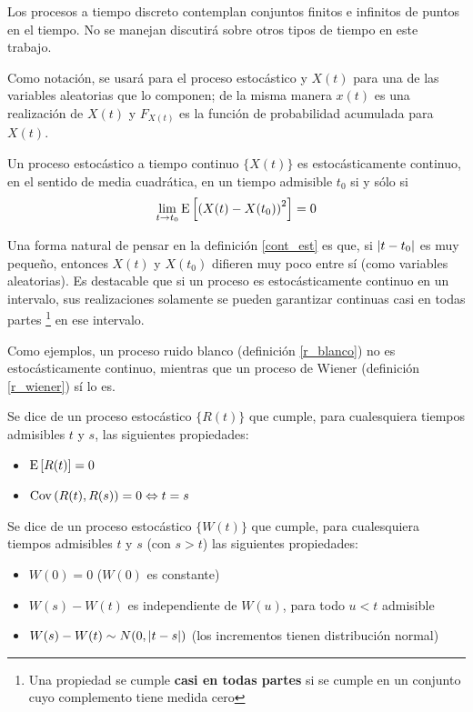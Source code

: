 Los procesos a tiempo discreto contemplan conjuntos finitos e infinitos de puntos en el tiempo.
No se manejan discutirá sobre otros tipos de tiempo en este trabajo.

Como notación, se usará \xt  para el proceso estocástico y $X(t)$ para una de las variables
aleatorias que lo componen; de la misma manera $x(t)$ es una realización de $X(t)$ y $F_{X(t)}$ 
es la función de probabilidad acumulada para $X(t)$.



\begin{definicion}
Un proceso estocástico a tiempo continuo $\{ X(t) \}$ es estocásticamente continuo, en el 
sentido de media cuadrática, en un tiempo admisible $t_0$ si y sólo si
\begin{equation*}
\lim_{t \rightarrow t_0} \mathrm{E}\left[ \left( X(t) - X(t_0) \right)^{2} \right] = 0
\end{equation*}
\label{cont_est}
\end{definicion}

Una forma natural de pensar en la definición \ref{cont_est} es que, si $\left| t-t_0 \right|$ es muy 
pequeño, entonces $X(t)$ y $X(t_0)$ difieren muy poco entre s\'i (como variables aleatorias).
Es destacable que si un proceso es estocásticamente continuo en un intervalo, sus realizaciones 
solamente se pueden garantizar continuas casi en todas partes \footnote{Una propiedad se cumple 
\textbf{casi en todas partes} si se cumple en un conjunto cuyo complemento tiene medida cero} en 
ese intervalo.

Como ejemplos, un proceso ruido blanco (definición \ref{r_blanco}) no es estocásticamente 
continuo, mientras que un proceso de Wiener (definición \ref{r_wiener}) s\'i lo es.

\begin{definicion}
Se dice de un proceso estocástico $\{ R(t) \}$ que cumple, para cualesquiera tiempos admisibles
$t$ y $s$, las siguientes propiedades:
\begin{itemize}
\item $\mathrm{E}\left[ R(t) \right]=0$
\item $\mathrm{Cov}\left( R(t),R(s) \right)=0 \Leftrightarrow t=s$ 
\end{itemize}
\label{r_blanco}
\end{definicion}

\begin{definicion}
Se dice de un proceso estocástico $\{ W(t) \}$ que cumple, para cualesquiera tiempos admisibles
$t$ y $s$ (con $s>t$) las siguientes propiedades:
\begin{itemize}
\item $W(0) = 0$ ($W(0)$ es constante)
\item $W(s)-W(t)$ es independiente de $W(u)$, para todo $u<t$ admisible
\item $W(s)-W(t) \sim N(0,\left| t-s \right|)$  (los incrementos tienen distribución normal)
\end{itemize}
\label{r_wiener}
\end{definicion}


